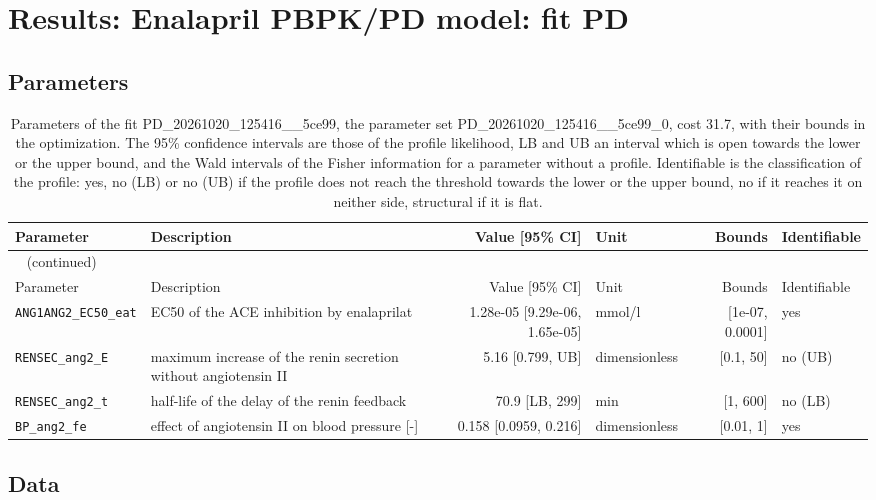 \section{Results: Enalapril PBPK/PD model: fit PD}

\subsection{Parameters}

\begin{longtable}{llrlrl}
\caption{Parameters of the fit PD\_20261020\_125416\_\_5ce99, the parameter set PD\_20261020\_125416\_\_5ce99\_0, cost 31.7, with their bounds in the optimization. The 95\% confidence intervals are those of the profile likelihood, LB and UB an interval which is open towards the lower or the upper bound, and the Wald intervals of the Fisher information for a parameter without a profile. Identifiable is the classification of the profile: yes, no (LB) or no (UB) if the profile does not reach the threshold towards the lower or the upper bound, no if it reaches it on neither side, structural if it is flat.}\label{tab:parameters:PD_20261020_125416__5ce99} \\
\toprule
Parameter & Description & Value [95\% CI] & Unit & Bounds & Identifiable \\
\midrule
\endfirsthead
\multicolumn{6}{l}{\small\tablename~\thetable{} (continued)} \\
\toprule
Parameter & Description & Value [95\% CI] & Unit & Bounds & Identifiable \\
\midrule
\endhead
\bottomrule
\endlastfoot
\texttt{ANG1ANG2\_EC50\_eat} & EC50 of the ACE inhibition by enalaprilat & 1.28e-05 [9.29e-06, 1.65e-05] & mmol/l & [1e-07, 0.0001] & yes \\
\texttt{RENSEC\_ang2\_E} & maximum increase of the renin secretion without angiotensin II & 5.16 [0.799, UB] & dimensionless & [0.1, 50] & no (UB) \\
\texttt{RENSEC\_ang2\_t} & half-life of the delay of the renin feedback & 70.9 [LB, 299] & min & [1, 600] & no (LB) \\
\texttt{BP\_ang2\_fe} & effect of angiotensin II on blood pressure [-] & 0.158 [0.0959, 0.216] & dimensionless & [0.01, 1] & yes \\
\end{longtable}

\subsection{Data}

